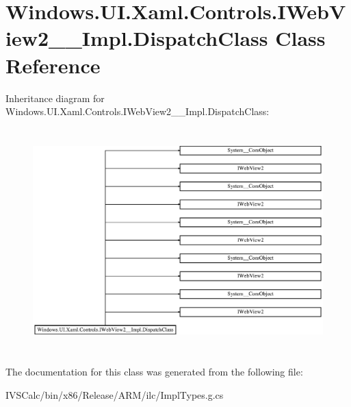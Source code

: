 \hypertarget{class_windows_1_1_u_i_1_1_xaml_1_1_controls_1_1_i_web_view2_____impl_1_1_dispatch_class}{}\section{Windows.\+U\+I.\+Xaml.\+Controls.\+I\+Web\+View2\+\_\+\+\_\+\+Impl.\+Dispatch\+Class Class Reference}
\label{class_windows_1_1_u_i_1_1_xaml_1_1_controls_1_1_i_web_view2_____impl_1_1_dispatch_class}
Inheritance diagram for Windows.\+U\+I.\+Xaml.\+Controls.\+I\+Web\+View2\+\_\+\+\_\+\+Impl.\+Dispatch\+Class\+:\begin{figure}[H]
\begin{center}
\leavevmode
\includegraphics[height=8.676057cm]{class_windows_1_1_u_i_1_1_xaml_1_1_controls_1_1_i_web_view2_____impl_1_1_dispatch_class}
\end{center}
\end{figure}


The documentation for this class was generated from the following file\+:\begin{DoxyCompactItemize}
\item 
I\+V\+S\+Calc/bin/x86/\+Release/\+A\+R\+M/ilc/Impl\+Types.\+g.\+cs\end{DoxyCompactItemize}
